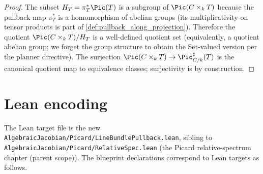 \begin{proof}
  
\leanok
  The subset \(H_T = \pi_T^*\Pic(T)\) is a subgroup of \(\Pic(C \times_k T)\)
  because the pullback map \(\pi_T^*\) is a homomorphism of abelian groups (its
  multiplicativity on tensor products is part of
  \cref{def:pullback_along_projection}). Therefore the quotient
  \(\Pic(C \times_k T) / H_T\) is a well-defined quotient set (equivalently, a
  quotient abelian group; we forget the group structure to obtain the
  Set-valued version per the planner directive). The surjection
  \(\Pic(C \times_k T) \to \Pic^\sharp_{C/k}(T)\) is the canonical quotient map
  to equivalence classes; surjectivity is by construction.
\end{proof}

\section{Lean encoding}
\label{sec:lbp_lean_encoding}

The Lean target file is the new
\texttt{AlgebraicJacobian/Picard/LineBundlePullback.lean}, sibling to
\texttt{AlgebraicJacobian/Picard/RelativeSpec.lean}
(the Picard relative-spectrum chapter (parent scope)). The blueprint declarations correspond to
Lean targets as follows.

